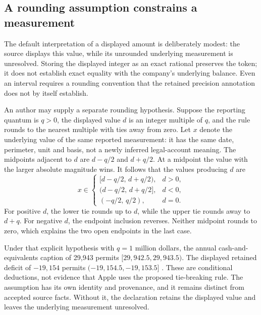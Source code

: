 \subsection{A rounding assumption constrains a measurement}

The default interpretation of a displayed amount is deliberately modest:
the source displays this value, while its unrounded underlying measurement
is unresolved. Storing the displayed integer as an exact rational preserves
the token; it does not establish exact equality with the company's
underlying balance. Even an interval requires a rounding convention that
the retained precision annotation does not by itself establish.

An author may supply a separate rounding hypothesis. Suppose the reporting
quantum is \(q>0\), the displayed value \(d\) is an integer multiple of
\(q\), and the rule rounds to the nearest multiple with ties away from
zero. Let \(x\) denote the underlying value of the same reported
measurement: it has the same date, perimeter, unit and basis, not a newly
inferred legal-account meaning. The midpoints adjacent to \(d\) are
\(d-q/2\) and \(d+q/2\). At a midpoint the value with the larger absolute
magnitude wins. It follows that the values producing \(d\) are
\begin{equation}
\label{eq:source-rounding-preimage}
  x\in
  \begin{cases}
    [d-q/2,\,d+q/2), & d>0,\\
    (d-q/2,\,d+q/2], & d<0,\\
    (-q/2,\,q/2), & d=0.
  \end{cases}
\end{equation}
For positive \(d\), the lower tie rounds up to \(d\), while the upper tie
rounds away to \(d+q\). For negative \(d\), the endpoint inclusion
reverses. Neither midpoint rounds to zero, which explains the two open
endpoints in the last case.

Under that explicit hypothesis with \(q=1\) million dollars, the annual
cash-and-equivalents caption of 29,943 permits
\([29{,}942.5,29{,}943.5)\). The displayed retained deficit of
\(-19{,}154\) permits \((-19{,}154.5,-19{,}153.5]\)
\citep[p.~31]{apple2024}. These are conditional deductions, not evidence
that Apple uses the proposed tie-breaking rule. The assumption has its own
identity and provenance, and it remains distinct from accepted source facts.
Without it, the declaration retains the displayed value and leaves the
underlying measurement unresolved.


